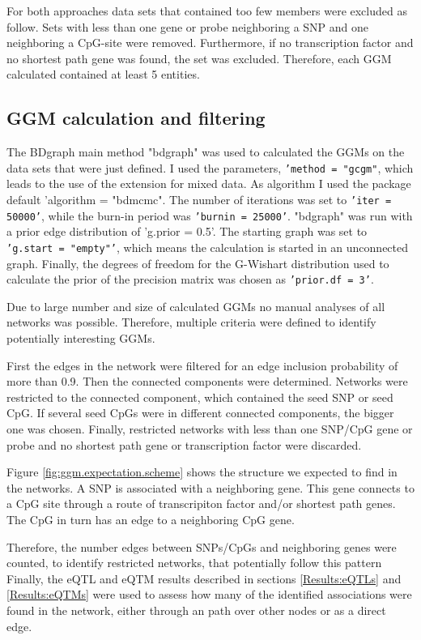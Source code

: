 \documentclass[a4paper,12pt,twoside,openright]{report}
\begin{document}
For both approaches data sets that contained too few members were excluded as follow. Sets with less than one gene or probe neighboring a SNP and one neighboring a CpG-site were removed. Furthermore, if no transcription factor and no shortest path gene was found, the set was excluded. Therefore, each GGM calculated contained at least 5 entities.

\subsection{GGM calculation and filtering}
\label{Methods:GGM calculation and filtering}
The BDgraph main method "bdgraph" was used to calculated the GGMs on the data sets that were just defined. I used the parameters, \texttt{'method = "gcgm"}, which leads to the use of the extension for mixed data. As algorithm I used the package default 'algorithm = "bdmcmc". The number of iterations was set to \texttt{'iter = 50000'}, while the burn-in period was \texttt{'burnin = 25000'}. "bdgraph" was run with a prior edge distribution of 'g.prior = 0.5'. The starting graph was set to \texttt{'g.start = "empty"'}, which means the calculation is started in an unconnected graph. Finally, the degrees of freedom for the G-Wishart distribution used to calculate the prior of the precision matrix was chosen as \texttt{'prior.df = 3'}.

Due to large number and size of calculated GGMs no manual analyses of all networks was possible. Therefore, multiple criteria were defined to identify potentially interesting GGMs.

First the edges in the network were filtered for an edge inclusion probability of more than 0.9. Then the connected components were determined. Networks were restricted to the connected component, which contained the seed SNP or seed CpG. If several seed CpGs were in different connected components, the bigger one was chosen. Finally, restricted networks with less than one SNP/CpG gene or probe and no shortest path gene or transcription factor were discarded. 

Figure \ref{fig:ggm.expectation.scheme} shows the structure we expected to find in the networks. A SNP is associated with a neighboring gene. This gene connects to a CpG site through a route of transcripiton factor and/or shortest path genes. The CpG in turn has an edge to a neighboring CpG gene. 

Therefore, the number edges between SNPs/CpGs and neighboring genes were counted, to identify restricted networks, that potentially follow this pattern Finally, the eQTL and eQTM results described in sections \ref{Results:eQTLs} and \ref{Results:eQTMs} were used to assess how many of the identified associations were found in the network, either through an path over other nodes or as a direct edge. 
\end{document}
